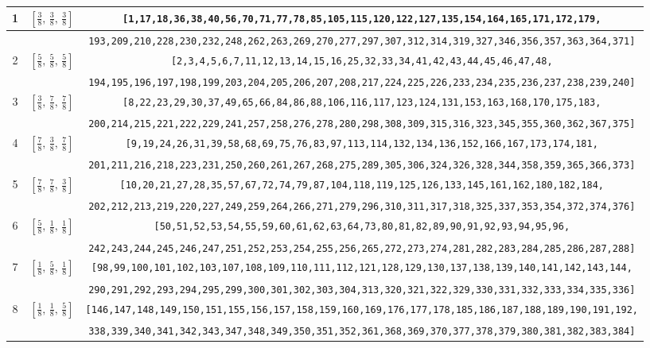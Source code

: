 \documentclass[fleqn,8pt]{jsarticle}
\begin{document}
\begin{longtable}{ccc}
1 & $\left[ \frac{3}{8},\, \frac{3}{8},\, \frac{3}{8} \right]$ & {\tt [1,17,18,36,38,40,56,70,71,77,78,85,105,115,120,122,127,135,154,164,165,171,172,179,} \\ \hline
 &  & {\tt 193,209,210,228,230,232,248,262,263,269,270,277,297,307,312,314,319,327,346,356,357,363,364,371]} \\ \hline
2 & $\left[ \frac{5}{8},\, \frac{5}{8},\, \frac{5}{8} \right]$ & {\tt [2,3,4,5,6,7,11,12,13,14,15,16,25,32,33,34,41,42,43,44,45,46,47,48,} \\ \hline
 &  & {\tt 194,195,196,197,198,199,203,204,205,206,207,208,217,224,225,226,233,234,235,236,237,238,239,240]} \\ \hline
3 & $\left[ \frac{3}{8},\, \frac{7}{8},\, \frac{7}{8} \right]$ & {\tt [8,22,23,29,30,37,49,65,66,84,86,88,106,116,117,123,124,131,153,163,168,170,175,183,} \\ \hline
 &  & {\tt 200,214,215,221,222,229,241,257,258,276,278,280,298,308,309,315,316,323,345,355,360,362,367,375]} \\ \hline
4 & $\left[ \frac{7}{8},\, \frac{3}{8},\, \frac{7}{8} \right]$ & {\tt [9,19,24,26,31,39,58,68,69,75,76,83,97,113,114,132,134,136,152,166,167,173,174,181,} \\ \hline
 &  & {\tt 201,211,216,218,223,231,250,260,261,267,268,275,289,305,306,324,326,328,344,358,359,365,366,373]} \\ \hline
5 & $\left[ \frac{7}{8},\, \frac{7}{8},\, \frac{3}{8} \right]$ & {\tt [10,20,21,27,28,35,57,67,72,74,79,87,104,118,119,125,126,133,145,161,162,180,182,184,} \\ \hline
 &  & {\tt 202,212,213,219,220,227,249,259,264,266,271,279,296,310,311,317,318,325,337,353,354,372,374,376]} \\ \hline
6 & $\left[ \frac{5}{8},\, \frac{1}{8},\, \frac{1}{8} \right]$ & {\tt [50,51,52,53,54,55,59,60,61,62,63,64,73,80,81,82,89,90,91,92,93,94,95,96,} \\ \hline
 &  & {\tt 242,243,244,245,246,247,251,252,253,254,255,256,265,272,273,274,281,282,283,284,285,286,287,288]} \\ \hline
7 & $\left[ \frac{1}{8},\, \frac{5}{8},\, \frac{1}{8} \right]$ & {\tt [98,99,100,101,102,103,107,108,109,110,111,112,121,128,129,130,137,138,139,140,141,142,143,144,} \\ \hline
 &  & {\tt 290,291,292,293,294,295,299,300,301,302,303,304,313,320,321,322,329,330,331,332,333,334,335,336]} \\ \hline
8 & $\left[ \frac{1}{8},\, \frac{1}{8},\, \frac{5}{8} \right]$ & {\tt [146,147,148,149,150,151,155,156,157,158,159,160,169,176,177,178,185,186,187,188,189,190,191,192,} \\ \hline
 &  & {\tt 338,339,340,341,342,343,347,348,349,350,351,352,361,368,369,370,377,378,379,380,381,382,383,384]} \\
\end{longtable}
\end{document}
